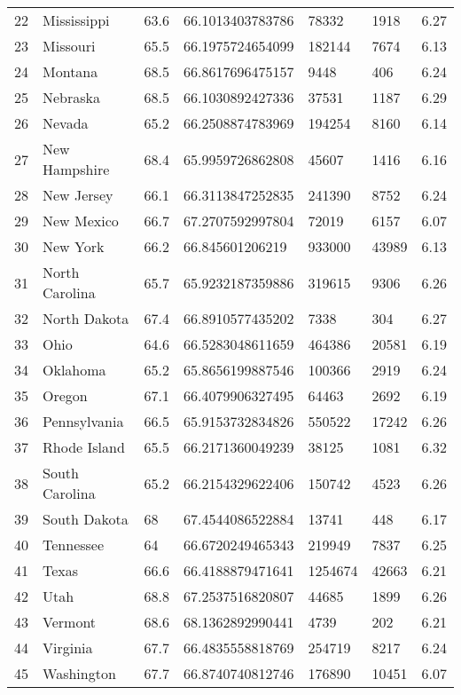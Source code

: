 \begin{table}[ht]
\begin{tabular}{rllllll}
  22 & Mississippi & 63.6 & 66.1013403783786 & 78332 & 1918 & 6.27 \\ 
  23 & Missouri & 65.5 & 66.1975724654099 & 182144 & 7674 & 6.13 \\ 
  24 & Montana & 68.5 & 66.8617696475157 & 9448 & 406 & 6.24 \\ 
  25 & Nebraska & 68.5 & 66.1030892427336 & 37531 & 1187 & 6.29 \\ 
  26 & Nevada & 65.2 & 66.2508874783969 & 194254 & 8160 & 6.14 \\ 
  27 & New Hampshire & 68.4 & 65.9959726862808 & 45607 & 1416 & 6.16 \\ 
  28 & New Jersey & 66.1 & 66.3113847252835 & 241390 & 8752 & 6.24 \\ 
  29 & New Mexico & 66.7 & 67.2707592997804 & 72019 & 6157 & 6.07 \\ 
  30 & New York & 66.2 & 66.845601206219 & 933000 & 43989 & 6.13 \\ 
  31 & North Carolina & 65.7 & 65.9232187359886 & 319615 & 9306 & 6.26 \\ 
  32 & North Dakota & 67.4 & 66.8910577435202 & 7338 & 304 & 6.27 \\ 
  33 & Ohio & 64.6 & 66.5283048611659 & 464386 & 20581 & 6.19 \\ 
  34 & Oklahoma & 65.2 & 65.8656199887546 & 100366 & 2919 & 6.24 \\ 
  35 & Oregon & 67.1 & 66.4079906327495 & 64463 & 2692 & 6.19 \\ 
  36 & Pennsylvania & 66.5 & 65.9153732834826 & 550522 & 17242 & 6.26 \\ 
  37 & Rhode Island & 65.5 & 66.2171360049239 & 38125 & 1081 & 6.32 \\ 
  38 & South Carolina & 65.2 & 66.2154329622406 & 150742 & 4523 & 6.26 \\ 
  39 & South Dakota & 68 & 67.4544086522884 & 13741 & 448 & 6.17 \\ 
  40 & Tennessee & 64 & 66.6720249465343 & 219949 & 7837 & 6.25 \\ 
  41 & Texas & 66.6 & 66.4188879471641 & 1254674 & 42663 & 6.21 \\ 
  42 & Utah & 68.8 & 67.2537516820807 & 44685 & 1899 & 6.26 \\ 
  43 & Vermont & 68.6 & 68.1362892990441 & 4739 & 202 & 6.21 \\ 
  44 & Virginia & 67.7 & 66.4835558818769 & 254719 & 8217 & 6.24 \\ 
  45 & Washington & 67.7 & 66.8740740812746 & 176890 & 10451 & 6.07 \\ 

\end{tabular}
\end{table}
